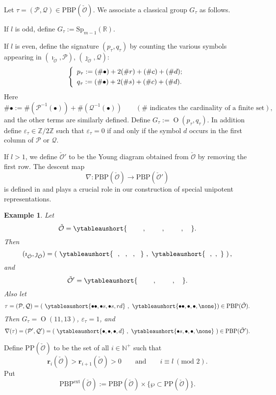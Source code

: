 \documentclass[lang = american]{ems-icm} %
\newcommand{\Z}{\mathbb{Z}}
\newcommand{\R}{\mathbb R}
\def\Sp{{\mathrm{Sp}}}
\newcommand{\oO}{\operatorname{O}}
\newcommand{\CO}{{\mathcal {O}}}
\newcommand{\CP}{{\mathcal {P}}}
\newcommand{\CQ}{{\mathcal {Q}}}
\let\ytb=\ytableaushort
\numberwithin{equation}{section}
\newtheorem*{exa*}{Example}
\theoremstyle{remark}
\begin{document}
Let $\tau=(\CP, \CQ)\in \mathrm{PBP}(\check \CO)$. We associate a classical group $G_\tau$ as follows.

If $l$ is odd, define $G_\tau:=\Sp_{m-1}(\R)$.

If $l$ is even, define the signature  $(p_\tau, q_\tau)$ by counting the various symbols appearing in $(\imath_{\check \CO}, \CP)$, $(\jmath_{\check \CO}, \CQ)$:
  \begin{equation*}\label{ptqt}
  \left\{
     \begin{array}{l}
    p_\tau :=( \# \bullet)+ 2 (\# r) +(\# c )+ (\# d);\smallskip\\
    q_\tau :=( \# \bullet)+ 2 (\# s) + (\# c) + (\# d).\\
    \end{array}
    \right.
\end{equation*}
Here
\[
\#\bullet:=\#(\CP^{-1}(\bullet))+\#(\CQ^{-1}(\bullet))\qquad (\textrm{$\#$ indicates the cardinality of a finite set}),
\]
and the other terms are similarly defined. Define $G_\tau:=\oO(p_\tau,q_\tau)$. In addition define $\varepsilon_\tau \in \Z/2\Z$ such that $\varepsilon_\tau=0$ if and only if the symbol $d$ occurs in the first column of $\CP$ or $\CQ$.


If $l>1$, we define $\check \CO'$ to be the Young diagram obtained from $\check \CO$ by removing the first row. The descent map
\[
\nabla: \mathrm{PBP}(\check \CO)\rightarrow\mathrm{PBP}(\check \CO')
\]
is defined in \cite[Section 2]{BMSZ3} and plays a crucial role in our construction of special unipotent representations.


\begin{exa*}
Let
\[
  \check \CO=\ytb{\ \ \ \ \ \ \ , \ \ \ \ \ \ \ , \ \ \ \ \ \ \ , \ \ \ }.
\]
Then
\[
(\imath_{\check \CO},\jmath_{\check \CO})= \left(\ \ytb{\ \ , \ \ , \ \ , \ \ }\ , \  \ytb{\ \ ,\ ,\  }\ \right),
\]
and
\[
  \check \CO'=\ytb{\ \ \ \ \ \ \ , \ \ \ \ \ \ \ , \ \ \ }.
\]
Also let
 \[
 \tau=(\CP,\CQ)= \left(\  \ytb{\bullet\bullet, \bullet s, \bullet s, r d}\ ,\  \ytb{\bullet\bullet,\bullet,\bullet, \none }\right)\in \mathrm{PBP}(\check \CO).
 \]
Then $G_\tau=\oO(11,13)$, $\varepsilon_\tau =1$, and
\[
\nabla(\tau)=(\CP',\CQ')=\left(\  \ytb{\bullet, \bullet , \bullet ,  d} \ , \
 \ytb{\bullet s,\bullet,\bullet, \none }\ \right)\in \mathrm{PBP}(\check \CO').
 \]

\end{exa*}



Define $ \mathrm{PP}(\check \CO)$ to be the set of all $i \in \mathbb N^+$ such that
\[
 \mathbf r_i(\check \CO)>\mathbf r_{i+1}(\check \CO)>0 \qquad \textrm{and}\qquad
 i\equiv l \ (\textrm{mod 2}).
\]
Put
\[
  \mathrm{PBP}^{\mathrm{ext}}(\check \CO):=
           \mathrm{PBP}(\check \CO)\times \{\wp\subset  \mathrm{PP}(\check \CO)\}.
\]
\end{document}
